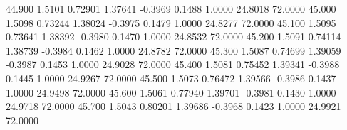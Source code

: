   44.900   1.5101   0.72901   1.37641  -0.3969   0.1488   1.0000  24.8018  72.0000
  45.000   1.5098   0.73244   1.38024  -0.3975   0.1479   1.0000  24.8277  72.0000
  45.100   1.5095   0.73641   1.38392  -0.3980   0.1470   1.0000  24.8532  72.0000
  45.200   1.5091   0.74114   1.38739  -0.3984   0.1462   1.0000  24.8782  72.0000
  45.300   1.5087   0.74699   1.39059  -0.3987   0.1453   1.0000  24.9028  72.0000
  45.400   1.5081   0.75452   1.39341  -0.3988   0.1445   1.0000  24.9267  72.0000
  45.500   1.5073   0.76472   1.39566  -0.3986   0.1437   1.0000  24.9498  72.0000
  45.600   1.5061   0.77940   1.39701  -0.3981   0.1430   1.0000  24.9718  72.0000
  45.700   1.5043   0.80201   1.39686  -0.3968   0.1423   1.0000  24.9921  72.0000
